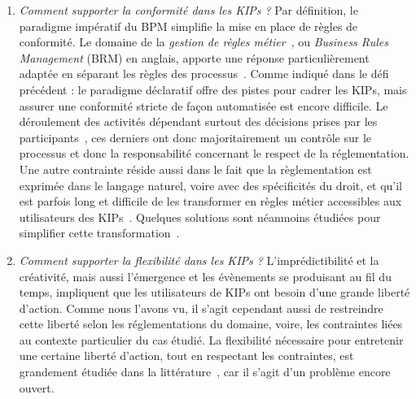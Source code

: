 \begin{enumerate}
\item \og \textit{Comment supporter la conformité dans les KIPs ?} \fg
Par définition, le paradigme impératif du BPM simplifie la mise en place de règles de conformité.
Le domaine de la \textit{gestion de règles métier}~\cite{ross2003manifesto}, ou \textit{Business Rules Management} (BRM) en anglais, apporte une réponse particulièrement adaptée en séparant les règles des processus~\cite{zur2007business}.
Comme indiqué dans le défi précédent : le paradigme déclaratif offre des pistes pour cadrer les KIPs, mais assurer une conformité stricte de façon automatisée est encore difficile.
Le déroulement des activités dépendant surtout des décisions prises par les participants~\cite{kushnareva2015modelingStatecharts}, ces derniers ont donc majoritairement un contrôle sur le processus et donc la responsabilité concernant le respect de la réglementation.
Une autre contrainte réside aussi dans le fait que la règlementation est exprimée dans le langage naturel, voire avec des spécificités du droit, et qu'il est parfois long et difficile de les transformer en règles métier accessibles aux utilisateurs des KIPs~\cite{zur2007business}.
Quelques solutions sont néanmoins étudiées pour simplifier cette transformation~\cite{zasada2018box}.\\

\item \og \textit{Comment supporter la flexibilité dans les KIPs ?} \fg
L'imprédictibilité et la créativité, mais aussi l'émergence et les évènements se produisant au fil du temps, impliquent que les utilisateurs de KIPs ont besoin d'une grande liberté d'action.
Comme nous l'avons vu, il s'agit cependant aussi de restreindre cette liberté selon les réglementations du domaine, voire, les contraintes liées au contexte particulier du cas étudié.
La flexibilité nécessaire pour entretenir une certaine liberté d'action, tout en respectant les contraintes, est grandement étudiée dans la littérature~\cite{riss2005challenges}\cite{herrmann2011adaptive}\cite{huber2015adaptive}\cite{tran2015embracing}\cite{de2016modeling}\cite{gromoff2017business}\cite{zensen2018comparison}, car il s'agit d'un problème encore ouvert.\\


\end{enumerate}
